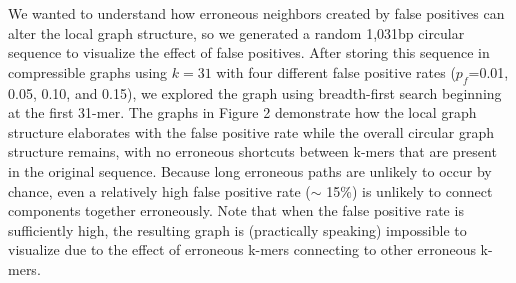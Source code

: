 \documentclass[12pt]{article} \usepackage{simplemargins}
\begin{document}
We wanted to understand how erroneous neighbors created by false
positives can alter the local graph structure, so we 
generated a random 1,031bp circular sequence to visualize the effect of false
positives.  After storing this sequence in compressible graphs using
$k=31$ with four different false positive rates ($p_f$=0.01, 0.05,
0.10, and 0.15), we explored the graph using breadth-first search
beginning at the first 31-mer.  The graphs in Figure 2 demonstrate how
the local graph structure elaborates with the false positive rate
while the overall circular graph structure remains, with no erroneous
shortcuts between k-mers that are present in the original
sequence. Because long erroneous paths are unlikely to occur by chance,
even a relatively high false positive rate ($\sim$ 15\%) is unlikely to
connect components together erroneously. Note that when the false
positive rate is sufficiently high, the resulting graph is
(practically speaking) impossible to visualize due to the effect of
erroneous k-mers connecting to other erroneous k-mers.
\end{document}
